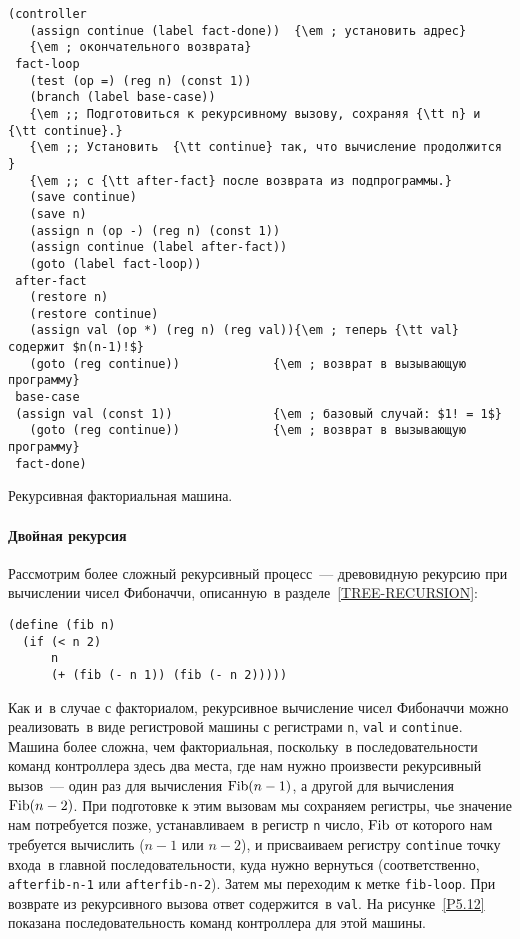 \begin{cntrfig}%

\begin{Verbatim}[fontsize=\small]
(controller
   (assign continue (label fact-done))  {\em ; установить адрес} 
   {\em ; окончательного возврата}
 fact-loop
   (test (op =) (reg n) (const 1))
   (branch (label base-case))
   {\em ;; Подготовиться к рекурсивному вызову, сохраняя {\tt n} и {\tt continue}.}
   {\em ;; Установить  {\tt continue} так, что вычисление продолжится }
   {\em ;; с {\tt after-fact} после возврата из подпрограммы.}
   (save continue)
   (save n)
   (assign n (op -) (reg n) (const 1))
   (assign continue (label after-fact))
   (goto (label fact-loop))
 after-fact
   (restore n)
   (restore continue)
   (assign val (op *) (reg n) (reg val)){\em ; теперь {\tt val} содержит $n(n-1)!$}
   (goto (reg continue))             {\em ; возврат в вызывающую программу}
 base-case
 (assign val (const 1))              {\em ; базовый случай: $1! = 1$}
   (goto (reg continue))             {\em ; возврат в вызывающую программу}
 fact-done)
\end{Verbatim}
\caption{Рекурсивная факториальная машина.
}
\label{P5.11}
\end{cntrfig}

\paragraph{Двойная рекурсия}


Рассмотрим более сложный рекурсивный процесс~--- древовидную
рекурсию при вычислении чисел Фибоначчи, описанную~в 
разделе~\ref{TREE-RECURSION}:

\begin{Verbatim}[fontsize=\small]
(define (fib n)
  (if (< n 2)
      n
      (+ (fib (- n 1)) (fib (- n 2)))))
\end{Verbatim}
Как и~в случае с факториалом, рекурсивное вычисление чисел Фибоначчи
можно реализовать~в виде  регистровой машины с регистрами
{\tt n}, {\tt val} и {\tt continue}.  Машина
более сложна, чем факториальная, поскольку~в последовательности команд
контроллера здесь два места, где нам нужно произвести рекурсивный
вызов~--- один раз для вычисления $\mathop{\rm Fib}(n-1)$, а
другой для вычисления $\mathop{\rm Fib}(n-2)$.  При подготовке
к этим вызовам мы сохраняем регистры, чье значение нам потребуется
позже, устанавливаем~в регистр {\tt n} число,
$\mathop{\rm Fib}$ от которого нам требуется вычислить
($n-1$ или $n-2$), и присваиваем регистру
{\tt continue} точку входа~в главной последовательности, куда
нужно вернуться (соответственно, {\tt afterfib-n-1} или
{\tt afterfib-n-2}). Затем мы переходим к метке
{\tt fib-loop}.  При возврате из рекурсивного вызова ответ
содержится~в {\tt val}. На рисунке~\ref{P5.12}
показана последовательность команд контроллера для этой машины.

